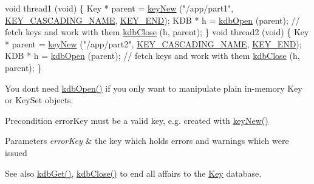 \begin{DoxyCodeInclude}
\textcolor{keywordtype}{void} thread1 (\textcolor{keywordtype}{void})
\{
        Key * parent = \hyperlink{group__key_gad23c65b44bf48d773759e1f9a4d43b89}{keyNew} (\textcolor{stringliteral}{"/app/part1"}, \hyperlink{group__key_gga91fb3178848bd682000958089abbaf40afc1567f74444ff9c219f7456b652b4ec}{KEY\_CASCADING\_NAME}, 
      \hyperlink{group__key_gga91fb3178848bd682000958089abbaf40aa8adb6fcb92dec58fb19410eacfdd403}{KEY\_END});
        KDB * h = \hyperlink{group__kdb_ga6808defe5870f328dd17910aacbdc6ca}{kdbOpen} (parent);
        \textcolor{comment}{// fetch keys and work with them}
        \hyperlink{group__kdb_gadb54dc9fda17ee07deb9444df745c96f}{kdbClose} (h, parent);
\}
\textcolor{keywordtype}{void} thread2 (\textcolor{keywordtype}{void})
\{
        Key * parent = \hyperlink{group__key_gad23c65b44bf48d773759e1f9a4d43b89}{keyNew} (\textcolor{stringliteral}{"/app/part2"}, \hyperlink{group__key_gga91fb3178848bd682000958089abbaf40afc1567f74444ff9c219f7456b652b4ec}{KEY\_CASCADING\_NAME}, 
      \hyperlink{group__key_gga91fb3178848bd682000958089abbaf40aa8adb6fcb92dec58fb19410eacfdd403}{KEY\_END});
        KDB * h = \hyperlink{group__kdb_ga6808defe5870f328dd17910aacbdc6ca}{kdbOpen} (parent);
        \textcolor{comment}{// fetch keys and work with them}
        \hyperlink{group__kdb_gadb54dc9fda17ee07deb9444df745c96f}{kdbClose} (h, parent);
\}
\end{DoxyCodeInclude}
 You don\textquotesingle{}t need \hyperlink{group__kdb_ga6808defe5870f328dd17910aacbdc6ca}{kdb\+Open()} if you only want to manipulate plain in-\/memory Key or Key\+Set objects.

\begin{DoxyPrecond}{Precondition}
error\+Key must be a valid key, e.\+g. created with \hyperlink{group__key_gad23c65b44bf48d773759e1f9a4d43b89}{key\+New()}
\end{DoxyPrecond}

\begin{DoxyParams}{Parameters}
{\em error\+Key} & the key which holds errors and warnings which were issued \\
\hline
\end{DoxyParams}
\begin{DoxySeeAlso}{See also}
\hyperlink{group__kdb_ga28e385fd9cb7ccfe0b2f1ed2f62453a1}{kdb\+Get()}, \hyperlink{group__kdb_gadb54dc9fda17ee07deb9444df745c96f}{kdb\+Close()} to end all affairs to the \hyperlink{group__key}{Key} database. 
\end{DoxySeeAlso}


